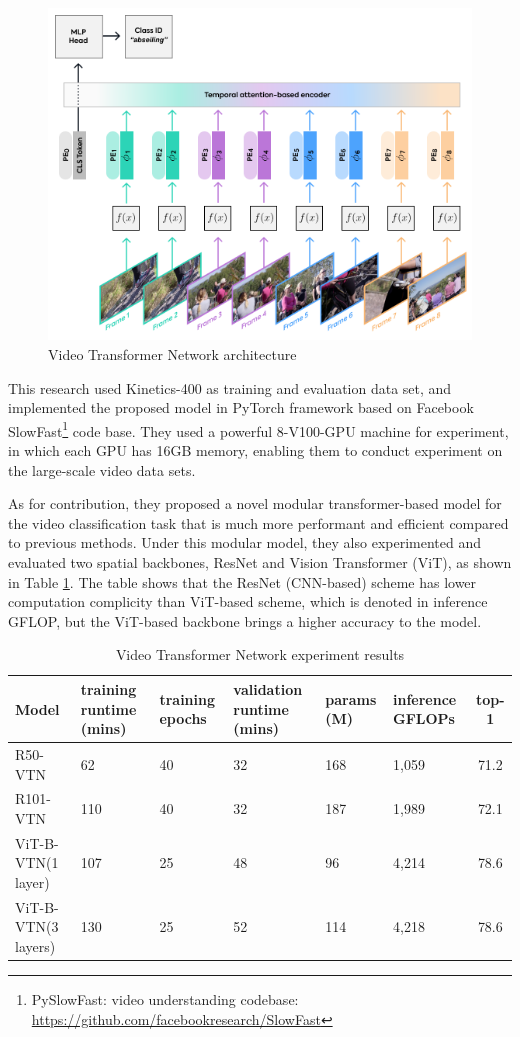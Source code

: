 \begin{figure}[!ht]
    \centering
    \includegraphics[width=.7\textwidth]{literature/imgs/ext-vtn.png}
    \caption{Video Transformer Network architecture \cite{neimark2021video}}
    \label{fig:ext-vtn}
\end{figure}

This research used Kinetics-400 as training and evaluation data set, and implemented the proposed model in PyTorch framework based on Facebook SlowFast\footnote{PySlowFast: video understanding codebase: \url{https://github.com/facebookresearch/SlowFast}} code base.
They used a powerful 8-V100-GPU machine for experiment, in which each GPU has 16GB memory, enabling them to conduct experiment on the large-scale video data sets.

As for contribution, they proposed a novel modular transformer-based model for the video classification task that is much more performant and efficient compared to previous methods.
Under this modular model, they also experimented and evaluated two spatial backbones, ResNet and Vision Transformer (ViT), as shown in Table \ref{tab:Video Transformer Network}.
The table shows that the ResNet (CNN-based) scheme has lower computation complicity than ViT-based scheme, which is denoted in inference GFLOP, but the ViT-based backbone brings a higher accuracy to the model.

\begin{table}[ht!]
\renewcommand{\arraystretch}{1.2}
\begin{tabularx}{\textwidth}{l|X|X|X|X|X|c}
Model & training runtime (mins) & training epochs & validation runtime (mins) & params (M) & inference GFLOPs & top-1 \\ \hline
R50-VTN & 62 & 40 & 32 & 168 & 1,059 & 71.2 \\
R101-VTN & 110 & 40 & 32 & 187 & 1,989 & 72.1 \\ \hline
ViT-B-VTN(1 layer) & 107 & 25 & 48 & 96 & 4,214 & 78.6\\
ViT-B-VTN(3 layers) & 130 & 25 & 52 & 114 & 4,218 & 78.6 
\end{tabularx}
\caption{Video Transformer Network experiment results \cite{neimark2021video}}
\label{tab:Video Transformer Network}
\end{table}


